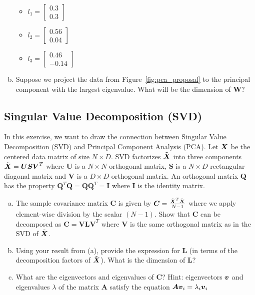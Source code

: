 \documentclass[11pt,a4paper]{article}
\begin{document}
\begin{enumerate}[(a)]
    \begin{itemize}
        \item $l_1 = \begin{bmatrix}0.3\\0.3\end{bmatrix}$
        \item $l_2 = \begin{bmatrix}0.56\\0.04\end{bmatrix}$
        \item $l_3 = \begin{bmatrix}0.46\\-0.14\end{bmatrix}$
    \end{itemize}
\item Suppose we project the data from Figure~\ref{fig:pca_proposal} to the principal component with the largest eigenvalue. What will be the dimension of $\boldsymbol{W}$?
\end{enumerate}

\subsection{Singular Value Decomposition (SVD)}
In this exercise, we want to draw the connection between Singular Value Decomposition (SVD) and Principal Component Analysis (PCA). Let $\tilde{\boldsymbol{X}}$ be the centered data matrix of size $N \times D$. SVD factorizes $\tilde{\boldsymbol{X}}$ into three components $\tilde{\boldsymbol{X}} = \boldsymbol{USV}^T$ where $\boldsymbol{U}$ is a $N \times N$ orthogonal matrix, $\boldsymbol{S}$ is a $N \times D$ rectangular diagonal matrix and $\boldsymbol{V}$ is a $D \times D$ orthogonal matrix. An orthogonal matrix $\boldsymbol{Q}$ has the property $\boldsymbol{Q}^T\boldsymbol{Q} = \boldsymbol{QQ}^T = \boldsymbol{I}$ where $\boldsymbol{I}$ is the identity matrix.

\begin{enumerate}[(a)]
    \item The sample covariance matrix $\boldsymbol{C}$ is given by $\boldsymbol{C} = \frac{\tilde{\boldsymbol{X}}^T\tilde{\boldsymbol{X}}}{N-1}$ where we apply element-wise division by the scalar $(N-1)$. Show that $\boldsymbol{C}$ can be decomposed as $\boldsymbol{C} = \boldsymbol{VLV}^T$ where $\boldsymbol{V}$ is the same orthogonal matrix as in the SVD of $\tilde{\boldsymbol{X}}$.
    \item Using your result from (a), provide the expression for $\boldsymbol{L}$ (in terms of the decomposition factors of $\tilde{\boldsymbol{X}}$). What is the dimension of $\boldsymbol{L}$?
    \item What are the eigenvectors and eigenvalues of $\boldsymbol{C}$? Hint: eigenvectors $\boldsymbol{v}$ and eigenvalues $\lambda$ of the matrix $\boldsymbol{A}$ satisfy the equation $\boldsymbol{A}\boldsymbol{v}_i = \lambda_i \boldsymbol{v}_i$
\end{enumerate}
\end{document}
